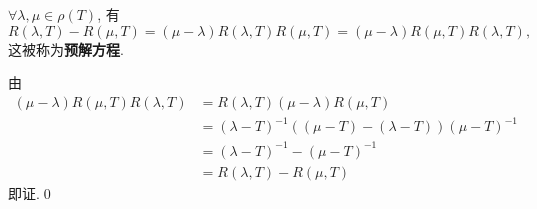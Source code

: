 \begin{Proposition}
	$ \forall \lambda, \mu\in\rho(T) $, 有
	\[
		R(\lambda, T)-R(\mu, T)=(\mu-\lambda)R(\lambda, T)R(\mu, T) = (\mu-\lambda)R(\mu, T)R(\lambda, T),
	\]
	这被称为\textbf{预解方程}.
\end{Proposition}
\begin{Proof}
	由
	\[
		\begin{aligned}
			(\mu-\lambda)R(\mu, T)R(\lambda, T) & = R(\lambda, T)(\mu-\lambda)R(\mu, T)               \\
			                                    & = (\lambda-T)^{-1}((\mu-T)-(\lambda-T))(\mu-T)^{-1} \\
			                                    & = (\lambda-T)^{-1}-(\mu-T)^{-1}                     \\
			                                    & = R(\lambda, T)-R(\mu, T)
		\end{aligned}
	\]
	即证.\qed
\end{Proof}

